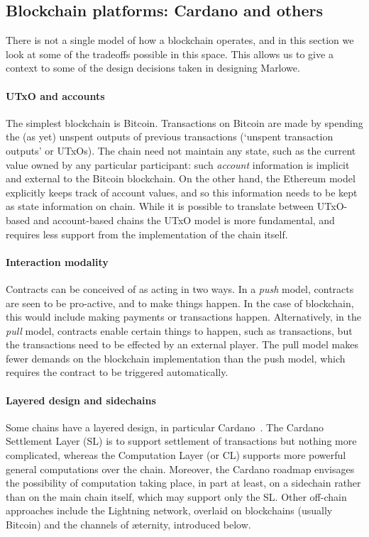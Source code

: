 \documentclass[
      acmsmall
    , screen
    , review=true
  ]{acmart}
\begin{document}
\subsection{Blockchain platforms: Cardano and others}

There is not a single model of how a blockchain operates, and in this section we look at some of the tradeoffs possible in this space. This allows us to give a context to some of the design decisions taken in designing Marlowe.  

\paragraph{UTxO and accounts}

The simplest blockchain is Bitcoin. Transactions on Bitcoin are made by spending the (as yet) unspent outputs of 
previous transactions (`unspent transaction outputs' or UTxOs). The chain need not maintain any state, such as the 
current value owned by any particular participant: such \emph{account} information is implicit and external to the 
Bitcoin blockchain. On the other hand, the Ethereum model explicitly keeps track of account values, and so this 
information needs to be kept as state information on chain. While it is possible to translate between UTxO-based and 
account-based chains  the UTxO model is more fundamental, and requires less support from the 
implementation of the chain itself.

\paragraph{Interaction modality}

Contracts can be conceived of as acting in two ways. In a \emph{push} model, contracts are seen to be pro-active, and to 
make things happen. In the case of blockchain, this would include making payments or transactions happen. 
Alternatively, in the \emph{pull} model, contracts enable certain things to happen, such as transactions, but the 
transactions need to be effected by an external player. The pull model makes fewer demands on the blockchain 
implementation than the push model, which requires the contract to be triggered automatically.

\paragraph{Layered design and sidechains}

Some chains have a layered design, in particular Cardano~\cite{cardano}. The Cardano Settlement Layer (SL) is to support settlement of transactions but nothing more complicated, whereas the Computation Layer (or CL) supports more powerful general computations over the chain. Moreover, the Cardano roadmap \cite{cardano-rationale} envisages the possibility of computation taking place, in part at least, on a sidechain rather than on the main chain itself, which may support only the SL. Other off-chain approaches include the Lightning network, overlaid on blockchains (usually Bitcoin) and the channels of \ae{}ternity, introduced below.
\end{document}
